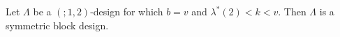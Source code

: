 Let $\Lambda$ be a $(; 1, 2)$-design for which $b = v$ and $\lambda^*(2) < k < v$. Then $\Lambda$ is a symmetric block design.
